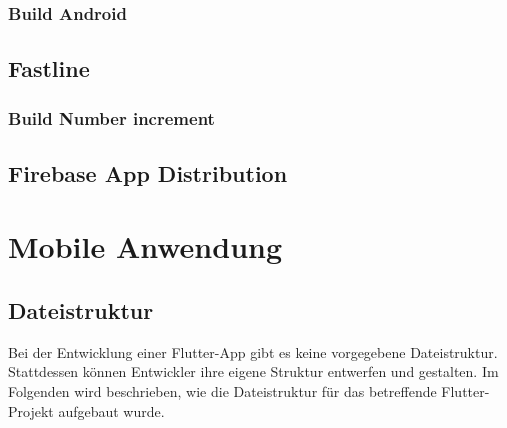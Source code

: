 




\subsubsection{Build Android}

\subsection{Fastline}
\subsubsection{Build Number increment}
\subsection{Firebase App Distribution}

\section{Mobile Anwendung}
\subsection{Dateistruktur}
Bei der Entwicklung einer Flutter-App gibt es keine vorgegebene Dateistruktur. Stattdessen können Entwickler ihre eigene Struktur entwerfen und gestalten. Im Folgenden wird beschrieben, wie die Dateistruktur für das betreffende Flutter-Projekt aufgebaut wurde.

